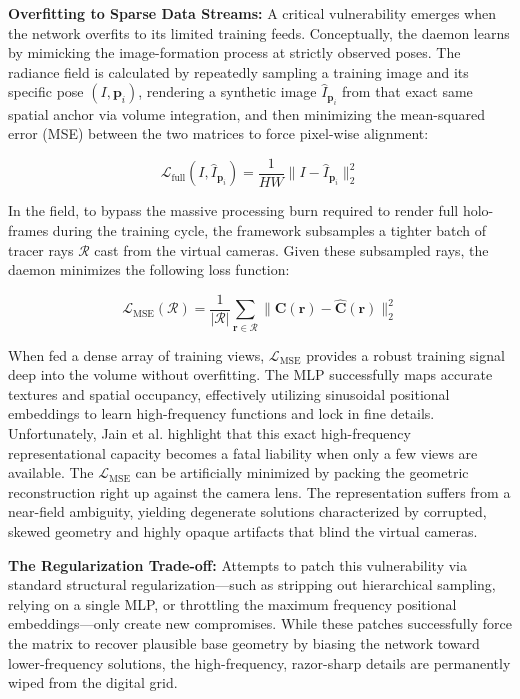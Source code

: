 \textbf{Overfitting to Sparse Data Streams:} 
A critical vulnerability emerges when the network overfits to its limited training feeds. Conceptually, the daemon learns by mimicking the image-formation process at strictly observed poses. The radiance field is calculated by repeatedly sampling a training image and its specific pose $(I, \mathbf{p}_i)$, rendering a synthetic image $\hat{I}_{\mathbf{p}_i}$ from that exact same spatial anchor via volume integration, and then minimizing the mean-squared error (MSE) between the two matrices to force pixel-wise alignment:

\begin{equation}
\mathcal{L}_{\text{full}}(I, \hat{I}_{\mathbf{p}_i}) = \frac{1}{HW} \| I - \hat{I}_{\mathbf{p}_i} \|_2^2
\end{equation}

In the field, to bypass the massive processing burn required to render full holo-frames during the training cycle, the framework subsamples a tighter batch of tracer rays $\mathcal{R}$ cast from the virtual cameras. Given these subsampled rays, the daemon minimizes the following loss function:

\begin{equation}
\mathcal{L}_{\text{MSE}}(\mathcal{R}) = \frac{1}{|\mathcal{R}|} \sum_{\mathbf{r} \in \mathcal{R}} \| \mathbf{C}(\mathbf{r}) - \hat{\mathbf{C}}(\mathbf{r}) \|_2^2
\end{equation}

When fed a dense array of training views, $\mathcal{L}_{\text{MSE}}$ provides a robust training signal deep into the volume without overfitting. The MLP successfully maps accurate textures and spatial occupancy, effectively utilizing sinusoidal positional embeddings to learn high-frequency functions and lock in fine details. Unfortunately, Jain et al. \cite{jain2021dietnerf} highlight that this exact high-frequency representational capacity becomes a fatal liability when only a few views are available. The $\mathcal{L}_{\text{MSE}}$ can be artificially minimized by packing the geometric reconstruction right up against the camera lens. The representation suffers from a near-field ambiguity, yielding degenerate solutions characterized by corrupted, skewed geometry and highly opaque artifacts that blind the virtual cameras.

\textbf{The Regularization Trade-off:} 
Attempts to patch this vulnerability via standard structural regularization—such as stripping out hierarchical sampling, relying on a single MLP, or throttling the maximum frequency positional embeddings—only create new compromises. While these patches successfully force the matrix to recover plausible base geometry by biasing the network toward lower-frequency solutions, the high-frequency, razor-sharp details are permanently wiped from the digital grid.

